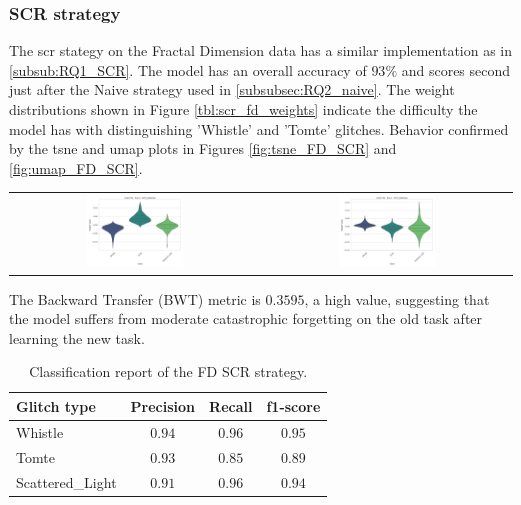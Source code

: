 \subsubsection{SCR strategy}
\label{subsubsec:RQ2_scr}
The \acrshort{scr} stategy on the Fractal Dimension data has a similar implementation as in \ref{subsub:RQ1_SCR}. The model has an overall accuracy of $93\%$ and scores second just after the Naive strategy used in \ref{subsubsec:RQ2_naive}. 
The weight distributions shown in Figure \ref{tbl:scr_fd_weights} indicate the difficulty the model has with distinguishing 'Whistle' and 'Tomte' glitches. Behavior confirmed by the \acrshort{tsne} and \acrshort{umap} plots in Figures \ref{fig:tsne_FD_SCR} and \ref{fig:umap_FD_SCR}. 
\begin{center}
\begin{tabular}{cc}
\includegraphics[width=0.4\textwidth]{Images/SCR_MultiView_exp_0.png} & \includegraphics[width=0.4\textwidth]{Images/SCR_MultiView_exp_2.png} \\
\end{tabular}
\label{tbl:scr_fd_weights}
\end{center}
The Backward Transfer (BWT) metric is $0.3595$, a high value, suggesting that the model suffers from moderate catastrophic forgetting on the old task after learning the new task.  

\begin{table}[ht]
\centering
    \begin{tabular}{|l|c c c|}
    \hline
    \textbf{Glitch type} & \textbf{Precision} & \textbf{Recall} & \textbf{f1-score} \\ \hline
    Whistle & $0.94$ & $0.96$ & $0.95$ \\
    Tomte & $0.93$ & $0.85$ & $0.89$ \\
    Scattered\_Light & $0.91$ & $0.96$ & $0.94$ \\
    \hline
    \end{tabular}
    \caption{Classification report of the FD SCR strategy.}
    \label{tbl:RQ2_class_report_FD_SCR}
\end{table}

